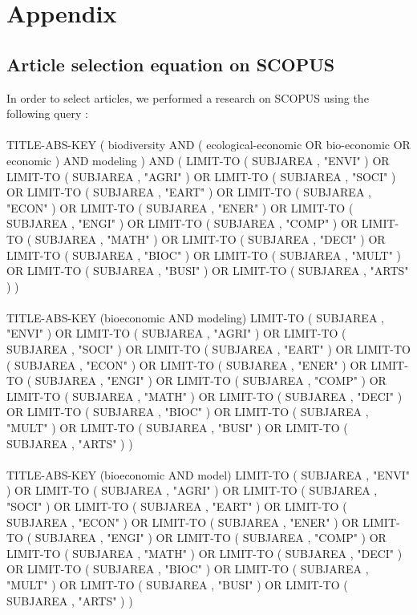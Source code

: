 \section{Appendix}

\onehalfspacing


\subsection{Article selection equation on SCOPUS}
\label{appendix:SCOPUS}
In order to select articles, we performed a research on SCOPUS using the following query : \\\\

TITLE-ABS-KEY ( biodiversity  AND  ( ecological-economic  OR  bio-economic  OR  economic )  AND  modeling )  AND  ( LIMIT-TO ( SUBJAREA ,  "ENVI" )  OR  LIMIT-TO ( SUBJAREA ,  "AGRI" )  OR  LIMIT-TO ( SUBJAREA ,  "SOCI" )  OR  LIMIT-TO ( SUBJAREA ,  "EART" )  OR  LIMIT-TO ( SUBJAREA ,  "ECON" )  OR  LIMIT-TO ( SUBJAREA ,  "ENER" )  OR  LIMIT-TO ( SUBJAREA ,  "ENGI" )  OR  LIMIT-TO ( SUBJAREA ,  "COMP" )  OR  LIMIT-TO ( SUBJAREA ,  "MATH" )  OR  LIMIT-TO ( SUBJAREA ,  "DECI" )  OR  LIMIT-TO ( SUBJAREA ,  "BIOC" )  OR  LIMIT-TO ( SUBJAREA ,  "MULT" )  OR  LIMIT-TO ( SUBJAREA ,  "BUSI" )  OR  LIMIT-TO ( SUBJAREA ,  "ARTS" ) ) 
\\\\
TITLE-ABS-KEY (bioeconomic AND modeling) LIMIT-TO ( SUBJAREA ,  "ENVI" )  OR  LIMIT-TO ( SUBJAREA ,  "AGRI" )  OR  LIMIT-TO ( SUBJAREA ,  "SOCI" )  OR  LIMIT-TO ( SUBJAREA ,  "EART" )  OR  LIMIT-TO ( SUBJAREA ,  "ECON" )  OR  LIMIT-TO ( SUBJAREA ,  "ENER" )  OR  LIMIT-TO ( SUBJAREA ,  "ENGI" )  OR  LIMIT-TO ( SUBJAREA ,  "COMP" )  OR  LIMIT-TO ( SUBJAREA ,  "MATH" )  OR  LIMIT-TO ( SUBJAREA ,  "DECI" )  OR  LIMIT-TO ( SUBJAREA ,  "BIOC" )  OR  LIMIT-TO ( SUBJAREA ,  "MULT" )  OR  LIMIT-TO ( SUBJAREA ,  "BUSI" )  OR  LIMIT-TO ( SUBJAREA ,  "ARTS" ) ) 
\\\\
TITLE-ABS-KEY (bioeconomic AND model) LIMIT-TO ( SUBJAREA ,  "ENVI" )  OR  LIMIT-TO ( SUBJAREA ,  "AGRI" )  OR  LIMIT-TO ( SUBJAREA ,  "SOCI" )  OR  LIMIT-TO ( SUBJAREA ,  "EART" )  OR  LIMIT-TO ( SUBJAREA ,  "ECON" )  OR  LIMIT-TO ( SUBJAREA ,  "ENER" )  OR  LIMIT-TO ( SUBJAREA ,  "ENGI" )  OR  LIMIT-TO ( SUBJAREA ,  "COMP" )  OR  LIMIT-TO ( SUBJAREA ,  "MATH" )  OR  LIMIT-TO ( SUBJAREA ,  "DECI" )  OR  LIMIT-TO ( SUBJAREA ,  "BIOC" )  OR  LIMIT-TO ( SUBJAREA ,  "MULT" )  OR  LIMIT-TO ( SUBJAREA ,  "BUSI" )  OR  LIMIT-TO ( SUBJAREA ,  "ARTS" ) ) 
